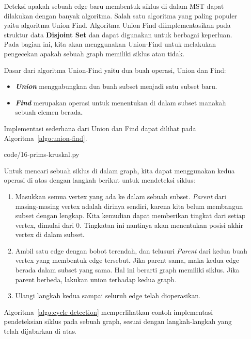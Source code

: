 Deteksi apakah sebuah edge baru membentuk siklus di dalam MST dapat dilakukan dengan banyak algoritma. Salah satu algoritma yang paling populer yaitu algoritma Union-Find. Algoritma Union-Find diimplementasikan pada struktur data \textbf{Disjoint Set} dan dapat digunakan untuk berbagai keperluan. Pada bagian ini, kita akan menggunakan Union-Find untuk melakukan pengecekan apakah sebuah graph memiliki siklus atau tidak.

Dasar dari algoritma Union-Find yaitu dua buah operasi, Union dan Find:

\begin{itemize}
    \item \textbf{\textit{Union}} menggabungkan dua buah subset menjadi satu subset baru.
    \item \textbf{\textit{Find}} merupakan operasi untuk menentukan di dalam subset manakah sebuah elemen berada.
\end{itemize}

Implementasi sederhana dari Union dan Find dapat dilihat pada Algoritma~\ref{algo:union-find}.


                {code/16-prims-kruskal.py}

Untuk mencari sebuah siklus di dalam graph, kita dapat menggunakan kedua operasi di atas dengan langkah berikut untuk mendeteksi siklus:

\begin{enumerate}
    \item Masukkan semua vertex yang ada ke dalam sebuah subset. \textit{Parent} dari masing-masing vertex adalah dirinya sendiri, karena kita belum membangun subset dengan lengkap. Kita kemudian dapat memberikan tingkat dari setiap vertex, dimulai dari 0. Tingkatan ini nantinya akan menentukan posisi akhir vertex di dalam subset.
    \item Ambil satu edge dengan bobot terendah, dan telusuri \textit{Parent} dari kedua buah vertex yang membentuk edge tersebut. Jika parent sama, maka kedua edge berada dalam subset yang sama. Hal ini berarti graph memiliki siklus. Jika parent berbeda, lakukan union terhadap kedua graph.
    \item Ulangi langkah kedua sampai seluruh edge telah dioperasikan.
\end{enumerate}

Algoritma~\ref{algo:cycle-detection} memperlihatkan contoh implementasi pendeteksian siklus pada sebuah graph, sesuai dengan langkah-langkah yang telah dijabarkan di atas.

